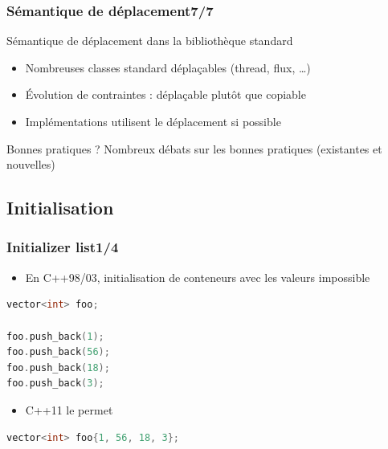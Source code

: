 \documentclass[C++.tex]{subfiles}
\begin{document}
\begin{frame}
	\frametitle{Sémantique de déplacement\titlehfill{}7/7}
	\begin{block}{Sémantique de déplacement dans la bibliothèque standard}
		\begin{itemize}
			\item Nombreuses classes standard déplaçables (thread, flux, \ldots)


			\item Évolution de contraintes : déplaçable plutôt que copiable

			
			\item Implémentations utilisent le déplacement si possible
		\end{itemize}
	\end{block}

	\begin{alertblock}{Bonnes pratiques ?}
		Nombreux débats sur les bonnes pratiques (existantes et nouvelles)

	\end{alertblock}
\end{frame}

\subsection*{Initialisation}
\begin{frame}[fragile]
	\frametitle{Initializer list\titlehfill{}1/4}
	\begin{itemize}
		\item En C++98/03, initialisation de conteneurs avec les valeurs impossible
	\end{itemize}

	\begin{lstlisting}[language=C++]
vector<int> foo;

foo.push_back(1);
foo.push_back(56);
foo.push_back(18);
foo.push_back(3);\end{lstlisting}

	\begin{itemize}
		\item C++11 le permet
	\end{itemize}

	\begin{lstlisting}[language=C++]
vector<int> foo{1, 56, 18, 3};\end{lstlisting}

\end{frame}
\end{document}
